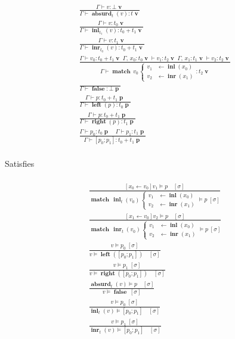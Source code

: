 \documentclass[twocolumn]{scrartcl}
\DeclareMathOperator{\val}{\textbf{v}}
\DeclareMathOperator{\prd}{\textbf{p}}
\DeclareMathOperator{\absurd}{\textbf{absurd}}
\DeclareMathOperator{\inl}{\textbf{inl}}
\DeclareMathOperator{\inr}{\textbf{inr}}
\DeclareMathOperator{\false}{\textbf{false}}
\DeclareMathOperator{\lft}{\textbf{left}}
\DeclareMathOperator{\rgt}{\textbf{right}}
\DeclareMathOperator{\update}{\leftarrow}
\DeclareMathOperator{\case}{\textbf{match}}
\begin{document}
\begin{multline*}
  \\
\frac{
  \Gamma \vdash v \colon \bot \val
}{
  \Gamma \vdash \absurd_t(v) \colon t \val
}\\
\frac{
  \Gamma \vdash v \colon t_0 \val
}{
  \Gamma \vdash \inl_{t_1}(v) \colon t_0 + t_1 \val
}\\
\frac{
  \Gamma \vdash v \colon t_1 \val
}{
  \Gamma \vdash \inr_{t_0}(v) \colon t_0 + t_1 \val
}\\
\frac{
  \Gamma \vdash v_0 \colon t_0 + t_1 \val \;
  \Gamma , \, x_0 \colon t_0 \val \vdash v_1 \colon t_2 \val \;
  \Gamma , \, x_1 \colon t_1 \val \vdash v_2 \colon t_2 \val
}{
  \Gamma \vdash
  \case \, v_0 \,
  \begin{cases}
   v_1 & \leftarrow \inl(x_0) \\
   v_2 & \leftarrow \inr(x_1)
  \end{cases}
  \colon t_2 \val
}\\
\frac{
}{
  \Gamma \vdash \false \colon \bot \prd
}\\
\frac{
  \Gamma \vdash p \colon t_0 + t_1 \prd
}{
  \Gamma \vdash \lft(p) \colon t_0 \prd
}\\
\frac{
  \Gamma \vdash p \colon t_0 + t_1 \prd
}{
  \Gamma \vdash \rgt(p) \colon t_1 \prd
}\\
\frac{
  \Gamma \vdash p_0 \colon t_0 \prd \quad
  \Gamma \vdash p_1 \colon t_1 \prd
}{
  \Gamma \vdash [ p_0 ; p_1 ] \colon t_0 + t_1 \prd
}\\
\end{multline*}

Satisfies

\begin{multline*}
  \\
\frac{
  [x_0 \update v_0] v_1 \models p \quad [\sigma]
}{
  \case \, \inl_t(v_0) \,
  \begin{cases}
    v_1 & \leftarrow \inl(x_0) \\
    v_2 & \leftarrow \inr(x_1)
  \end{cases}
 \models p \; [\sigma]
}\\
\frac{
  [x_1 \update v_0] v_2 \models p \quad [\sigma]
}{
  \case \, \inr_t(v_0) \,
  \begin{cases}
    v_1 & \leftarrow \inl(x_0) \\
    v_2 & \leftarrow \inr(x_1)
  \end{cases}
  \models p \; [\sigma]
}\\
\frac{
  v \models p_0 \; [\sigma]
}{
  v \models \lft([ p_0 ; p_1 ]) \quad [\sigma]
}\\
\frac{
  v \models p_1 \; [\sigma]
}{
  v \models \rgt([ p_0 ; p_1 ]) \quad [\sigma]
}\\
\frac{
  \absurd_t(v) \models p \quad [\sigma]
}{
  v \models \false \; [\sigma]
}\\
\frac{
  v \models p_0 \; [\sigma]
}{
  \inl_t(v) \models [ p_0 ; p_1 ] \quad [\sigma]
}\\
\frac{
  v \models p_1 \; [\sigma]
}{
  \inr_t(v) \models [ p_0 ; p_1 ] \quad [\sigma]
}\\
\end{multline*}
\end{document}
